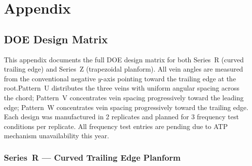 \chapter{Appendix}
\sffamily
\appendix
\section{DOE Design Matrix}
\label{app:doe_matrix}

This appendix documents the full DOE design matrix for both Series~R (curved trailing edge) and Series~Z (trapezoidal planform). All vein angles are measured from the conventional negative $y$-axis pointing toward the trailing edge at the root.Pattern~U distributes the three veins with uniform angular spacing across the chord; Pattern~V concentrates vein spacing progressively toward the leading edge; Pattern~W concentrates vein spacing progressively toward the trailing edge. Each design was manufactured in 2 replicates and planned for 3 frequency test conditions per replicate. All frequency test entries are pending due to ATP mechanism unavailability this year.

\subsection*{Series~R --- Curved Trailing Edge Planform}

